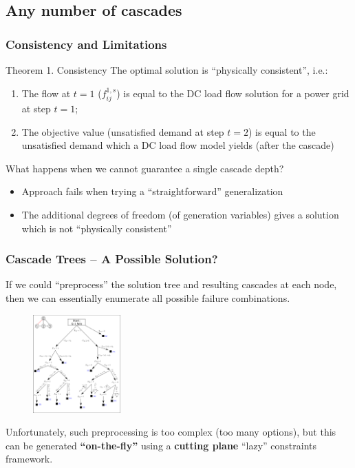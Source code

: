 \documentclass{beamer}
\begin{document}
\subsection{Any number of cascades}
\begin{frame}
\frametitle{Consistency and Limitations}
\begin{block}{Theorem 1. Consistency}
The optimal solution is ``physically consistent'', i.e.:
\begin{enumerate}
\item The flow at $t=1$ ($f_{ij}^{1,s}$) is equal to the DC load flow solution for a power grid at step $t=1$;
\item The objective value (unsatisfied demand at step $t=2$) is equal to the unsatisfied demand which a DC load flow model yields (after the cascade)
\end{enumerate}
\end{block}\pause
What happens when we cannot guarantee a single cascade depth? 
\begin{itemize}
	\item Approach fails when trying a ``straightforward'' generalization
	\item The additional degrees of freedom (of generation variables) gives a solution which is not ``physically consistent''
\end{itemize}
\end{frame}

\begin{frame}
\frametitle{Cascade Trees -- A Possible Solution?}
If we could ``preprocess'' the solution tree and resulting cascades at each node, then we can essentially enumerate all possible failure combinations.
\begin{figure}[h]
	\centering
		\includegraphics[width=0.30\textwidth]{Aux_files/figure_4_three-step-cascade-tree.png}
	\label{fig:figure_4_three-step-cascade-tree}
\end{figure}
Unfortunately, such preprocessing is too complex (too many options), but this can be generated \textbf{``on-the-fly''} using a \textbf{cutting plane} ``lazy'' constraints framework.
\end{frame}
\end{document}
